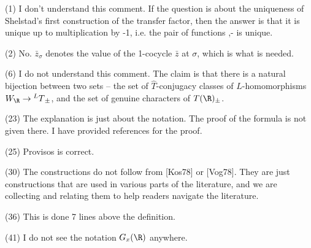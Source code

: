 (1) I don't understand this comment. If the question is about the uniqueness of Shelstad's first construction of the transfer factor, then the answer is that it is unique up to multiplication by -1, i.e. the pair of functions {\Delta,-\Delta} is unique.

(2) No. $\bar z_\sigma$ denotes the value of the 1-cocycle $\bar z$ at $\sigma$, which is what is needed.


(6) I do not understand this comment. The claim is that there is a natural bijection between two sets -- the set of $\hat T$-conjugacy classes of $L$-homomorphisms $W_\R \to {^LT}_\pm$, and the set of genuine characters of $T(\R)_\pm$.

(23) The explanation is just about the notation. The proof of the formula is not given there. I have provided references for the proof.

(25) Provisos is correct.

(30) The constructions do not follow from [Kos78] or [Vog78]. They are just constructions that are used in various parts of the literature, and we are collecting and relating them to help readers navigate the literature.

(36) This is done 7 lines above the definition.

(41) I do not see the notation $G_x(\R)$ anywhere.